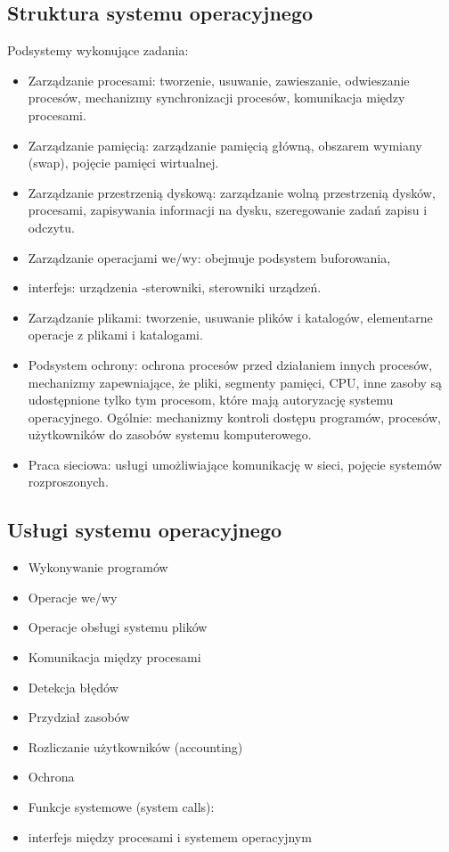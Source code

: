 \documentclass[11pt]{article}
\begin{document}
\subsection{Struktura systemu operacyjnego}

Podsystemy wykonujące zadania:

\begin{itemize}
    \item Zarządzanie procesami: tworzenie, usuwanie, zawieszanie, odwieszanie procesów, mechanizmy
          synchronizacji procesów, komunikacja między procesami.

    \item Zarządzanie pamięcią: zarządzanie pamięcią główną, obszarem wymiany (swap), pojęcie
          pamięci wirtualnej.

    \item Zarządzanie przestrzenią dyskową: zarządzanie wolną przestrzenią dysków, procesami,
          zapisywania informacji na dysku, szeregowanie zadań zapisu i odczytu.

    \item Zarządzanie operacjami we/wy: obejmuje podsystem buforowania,

    \item interfejs: urządzenia -sterowniki, sterowniki urządzeń.

    \item Zarządzanie plikami: tworzenie, usuwanie plików i katalogów,
          elementarne operacje z plikami i katalogami.

    \item Podsystem ochrony: ochrona procesów przed działaniem innych procesów, mechanizmy
          zapewniające, że pliki, segmenty pamięci, CPU, inne zasoby są udostępnione tylko tym
          procesom, które mają autoryzację systemu operacyjnego. Ogólnie: mechanizmy kontroli dostępu
          programów, procesów, użytkowników do zasobów systemu komputerowego.

    \item Praca sieciowa: usługi umożliwiające komunikację w sieci,
          pojęcie systemów rozproszonych.
\end{itemize}

\subsection{Usługi systemu operacyjnego}
\begin{itemize}
    \item Wykonywanie programów
    \item Operacje we/wy
    \item Operacje obsługi systemu plików
    \item Komunikacja między procesami
    \item Detekcja błędów
    \item Przydział zasobów
    \item Rozliczanie użytkowników (accounting)
    \item Ochrona
    \item Funkcje systemowe (system calls):
    \item interfejs między procesami i systemem operacyjnym
\end{itemize}
\end{document}
